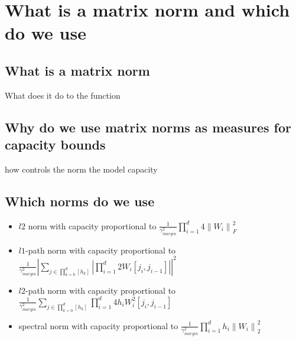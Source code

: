 
\section{What is a matrix norm and which do we use}
\subsection{What is a matrix norm}
What does it do to the function

\subsection{Why do we use matrix norms as measures for capacity bounds}
how controls the norm the model capacity

\subsection{Which norms do we use}
\begin{itemize}
	\item $l2$ norm with capacity proportional to  $\frac{1}{\gamma_{margin}^2} \prod_{i=1}^{d} 4 \left\| W_i  \right\|_F^2$ \inlineeqno
	\item $l1$-path norm with capacity proportional to $\frac{1}{\gamma_{margin}^2} \left| \sum_{j \in \prod_{k=0}^d[h_k]}^{} \left| \prod_{i=1}^{d} 2 W_i [j_i, j_{i-1}] \right|\right|^2$ \inlineeqno
	\item $l2$-path norm with capacity proportional to $\frac{1}{\gamma_{margin}^2} \sum_{j \in \prod_{k=0}^d[h_k]}^{} \prod_{i=1}^{d} 4 h_i W_i^2 [j_i, j_{i-1}]$ \inlineeqno
	\item spectral norm with capacity proportional to $\frac{1}{\gamma_{margin}^2} \prod_{i=1}^{d} h_i \left\| W_i  \right\|_2^2$ \inlineeqno
\end{itemize}